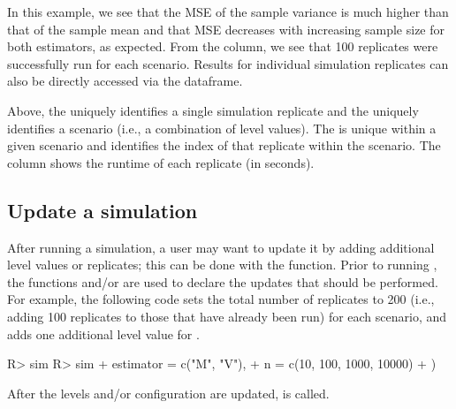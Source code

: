In this example, we see that the MSE of the sample variance is much higher than that of the sample mean and that MSE decreases with increasing sample size for both estimators, as expected. From the  column, we see that 100 replicates were successfully run for each scenario. Results for individual simulation replicates can also be directly accessed via the  dataframe.


Above, the  uniquely identifies a single simulation replicate and the  uniquely identifies a scenario (i.e., a combination of level values). The  is unique within a given scenario and identifies the index of that replicate within the scenario. The  column shows the runtime of each replicate (in seconds).

\subsection{Update a simulation}\label{ssec_update}

After running a simulation, a user may want to update it by adding additional level values or replicates; this can be done with the  function. Prior to running , the functions  and/or  are used to declare the updates that should be performed. For example, the following code sets the total number of replicates to 200 (i.e., adding 100 replicates to those that have already been run) for each scenario, and adds one additional level value for .

\begin{example}
R> sim %
R> sim %
+    estimator = c("M", "V"),
+    n = c(10, 100, 1000, 10000)
+  )
\end{example}

After the levels and/or configuration are updated,  is called.

